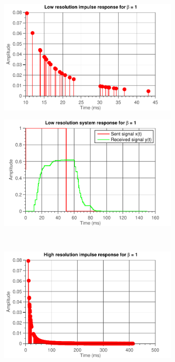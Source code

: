 \documentclass[11pt,titlepage]{report}
\begin{document}
\begin{figure}[H]
	\centering
	\begin{subfigure}{0.49\textwidth}
		\includegraphics[width=\textwidth]{../../deliverable-7-resources/figures/ass-1/report-1/ass-1-report-1-impulse-response-2-copies-beta-1.pdf}
	\end{subfigure}
	\begin{subfigure}{0.49\textwidth}
		\includegraphics[width=\textwidth]{../../deliverable-7-resources/figures/ass-1/report-1/ass-1-report-1-system-response-2-copies-beta-1.pdf}
	\end{subfigure}
	\\	%
	\begin{subfigure}{0.49\textwidth}
	\includegraphics[width=\textwidth]{../../deliverable-7-resources/figures/ass-1/report-1/ass-1-report-1-impulse-response-25-copies-beta-1.pdf}

\end{subfigure}
\end{figure}
\end{document}
